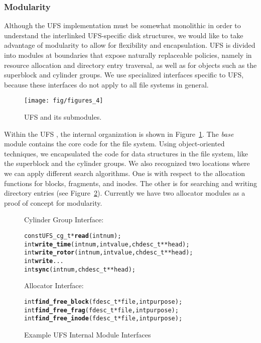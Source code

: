 \subsubsection {Modularity}
Although the UFS implementation must be somewhat monolithic in order to
understand the interlinked UFS-specific disk structures, we would like to take
advantage of modularity to allow for flexibility and encapsulation. UFS is
divided into modules at boundaries that expose naturally replaceable policies,
namely in resource allocation and directory entry traversal, as well as for
objects such as the superblock and cylinder groups. We use specialized
interfaces specific to UFS, because these interfaces do not apply to all file
systems in general.

\begin{figure}[htb]
  \centering
  \texttt{[image: fig/figures\_4]}
  \caption{\label{fig:ufsmodules} UFS and its submodules.}
\end{figure}

Within the UFS \module, the internal organization is shown in
Figure~\ref{fig:ufsmodules}. The \emph{base} module contains the core code for
the file system. Using object-oriented techniques, we encapsulated the code
for data structures in the file system, like the superblock and the cylinder
groups. We also recognized two locations where we can apply different search
algorithms. One is with respect to the allocation functions for blocks,
fragments, and inodes. The other is for searching and writing directory entries
(see Figure~\ref{fig:moduleinterface}). Currently we have two allocator modules
as a proof of concept for modularity.

\begin{figure}[htb]
Cylinder Group Interface:
\vspace{-0.5\baselineskip}
\begin{scriptsize}
\begin{alltt}
const UFS_cg_t * \textbf{read}(int num);
int \textbf{write_time}(int num, int value, chdesc_t ** head);
int \textbf{write_rotor}(int num, int value, chdesc_t ** head);
int \textbf{write}...
int \textbf{sync}(int num, chdesc_t ** head);
\end{alltt}
\end{scriptsize}

Allocator Interface:
\vspace{-0.5\baselineskip}
\begin{scriptsize}
\begin{alltt}
int \textbf{find_free_block}(fdesc_t * file, int purpose);
int \textbf{find_free_frag}(fdesc_t * file, int purpose);
int \textbf{find_free_inode}(fdesc_t * file, int purpose);
\end{alltt}
\end{scriptsize}
\vspace{-0.5\baselineskip}
\caption{\label{fig:moduleinterface} Example UFS Internal Module Interfaces}
\end{figure}

